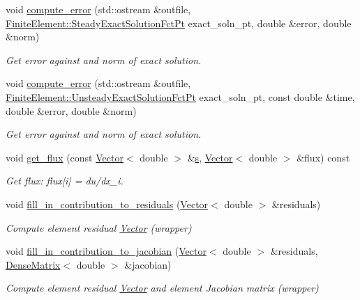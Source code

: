 \begin{DoxyCompactItemize}
void \hyperlink{classoomph_1_1WomersleyEquations_a29f1f7483545f64e8e04b24dcdce29ef}{compute\+\_\+error} (std\+::ostream \&outfile, \hyperlink{classoomph_1_1FiniteElement_a690fd33af26cc3e84f39bba6d5a85202}{Finite\+Element\+::\+Steady\+Exact\+Solution\+Fct\+Pt} exact\+\_\+soln\+\_\+pt, double \&error, double \&norm)
\begin{DoxyCompactList}\small\item\em Get error against and norm of exact solution. \end{DoxyCompactList}\item 
void \hyperlink{classoomph_1_1WomersleyEquations_a5db020d180881321f3dbd18e2971c407}{compute\+\_\+error} (std\+::ostream \&outfile, \hyperlink{classoomph_1_1FiniteElement_ad4ecf2b61b158a4b4d351a60d23c633e}{Finite\+Element\+::\+Unsteady\+Exact\+Solution\+Fct\+Pt} exact\+\_\+soln\+\_\+pt, const double \&time, double \&error, double \&norm)
\begin{DoxyCompactList}\small\item\em Get error against and norm of exact solution. \end{DoxyCompactList}\item 
void \hyperlink{classoomph_1_1WomersleyEquations_a5dccff3c238209806fefdebbbef91756}{get\+\_\+flux} (const \hyperlink{classoomph_1_1Vector}{Vector}$<$ double $>$ \&\hyperlink{cfortran_8h_ab7123126e4885ef647dd9c6e3807a21c}{s}, \hyperlink{classoomph_1_1Vector}{Vector}$<$ double $>$ \&flux) const
\begin{DoxyCompactList}\small\item\em Get flux\+: flux\mbox{[}i\mbox{]} = du/dx\+\_\+i. \end{DoxyCompactList}\item 
void \hyperlink{classoomph_1_1WomersleyEquations_ad0c342503c279bc697530d87059e7d48}{fill\+\_\+in\+\_\+contribution\+\_\+to\+\_\+residuals} (\hyperlink{classoomph_1_1Vector}{Vector}$<$ double $>$ \&residuals)
\begin{DoxyCompactList}\small\item\em Compute element residual \hyperlink{classoomph_1_1Vector}{Vector} (wrapper) \end{DoxyCompactList}\item 
void \hyperlink{classoomph_1_1WomersleyEquations_a4a0779392d756b1450d17879d0c10027}{fill\+\_\+in\+\_\+contribution\+\_\+to\+\_\+jacobian} (\hyperlink{classoomph_1_1Vector}{Vector}$<$ double $>$ \&residuals, \hyperlink{classoomph_1_1DenseMatrix}{Dense\+Matrix}$<$ double $>$ \&jacobian)
\begin{DoxyCompactList}\small\item\em Compute element residual \hyperlink{classoomph_1_1Vector}{Vector} and element Jacobian matrix (wrapper) \end{DoxyCompactList}\item 

\end{DoxyCompactItemize}
